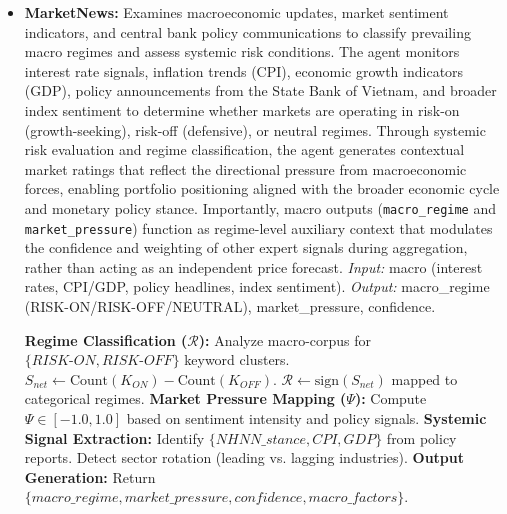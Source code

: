 \documentclass{ieeeaccess}
\begin{document}
\begin{itemize}
    \item \textbf{MarketNews:} 
    Examines macroeconomic updates, market sentiment indicators, and central bank policy communications to classify prevailing macro regimes and assess systemic risk conditions. The agent monitors interest rate signals, inflation trends (CPI), economic growth indicators (GDP), policy announcements from the State Bank of Vietnam, and broader index sentiment to determine whether markets are operating in risk-on (growth-seeking), risk-off (defensive), or neutral regimes. Through systemic risk evaluation and regime classification, the agent generates contextual market ratings that reflect the directional pressure from macroeconomic forces, enabling portfolio positioning aligned with the broader economic cycle and monetary policy stance.  
    Importantly, macro outputs (\texttt{macro\_regime} and \texttt{market\_pressure}) function as regime-level auxiliary context that modulates the confidence and weighting of other expert signals during aggregation, rather than acting as an independent price forecast.
    \textit{Input:} macro (interest rates, CPI/GDP, policy headlines, index sentiment).  
    \textit{Output:} macro\_regime (RISK-ON/RISK-OFF/NEUTRAL), market\_pressure, confidence.

    \begin{breakablealgorithm}
    \caption{MarketNews macro regime classification}
    \begin{algorithmic}[1]
    \STATE \textbf{Regime Classification ($\mathcal{R}$):}
    \STATE \quad Analyze macro-corpus for $\{RISK\text{-}ON, RISK\text{-}OFF\}$ keyword clusters.
    \STATE \quad $S_{net} \gets \text{Count}(K_{ON}) - \text{Count}(K_{OFF})$.
    \STATE \quad $\mathcal{R} \gets \text{sign}(S_{net})$ mapped to categorical regimes.
    \STATE \textbf{Market Pressure Mapping ($\Psi$):}
    \STATE \quad Compute $\Psi \in [-1.0, 1.0]$ based on sentiment intensity and policy signals.
    \STATE \textbf{Systemic Signal Extraction:}
    \STATE \quad Identify $\{NHNN\_stance, CPI, GDP\}$ from policy reports.
    \STATE \quad Detect sector rotation (leading vs. lagging industries).
    \STATE \textbf{Output Generation:}
    \STATE \quad Return $\{macro\_regime, market\_pressure, confidence, macro\_factors\}$.
    \end{algorithmic}
    \end{breakablealgorithm}


\end{itemize}
\end{document}
